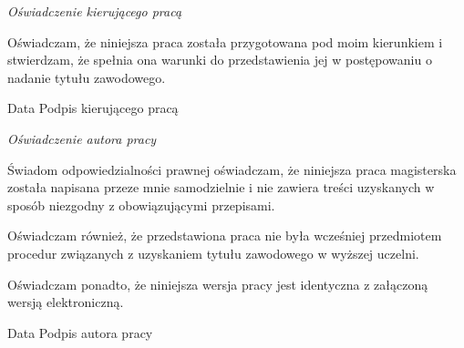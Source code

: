 
\newpage

\vspace{3cm}

{\setlength{\parindent}{0cm}

\textit{Oświadczenie kierującego pracą}

\vspace{0.5cm}

Oświadczam, że niniejsza praca została przygotowana pod moim kierunkiem i stwierdzam, że spełnia ona warunki do przedstawienia jej w postępowaniu o nadanie tytułu zawodowego.
 
\vspace{1.5cm}

\hspace{1cm} Data  \hspace{8cm}  Podpis kierującego pracą

\vspace{8cm}

\textit{Oświadczenie autora pracy}

\vspace{0.5cm}

Świadom odpowiedzialności prawnej oświadczam, że niniejsza praca magisterska została napisana przeze mnie samodzielnie i nie zawiera treści uzyskanych w sposób niezgodny z obowiązującymi przepisami.

\vspace{0.5cm}

Oświadczam również, że przedstawiona praca nie była wcześniej przedmiotem procedur związanych z uzyskaniem tytułu zawodowego w wyższej uczelni.

\vspace{0.5cm}

Oświadczam ponadto, że niniejsza wersja pracy jest identyczna z załączoną wersją elektroniczną.

\vspace{1.5cm}

 \hspace{1cm} Data  \hspace{8cm}  Podpis autora pracy
 
 }